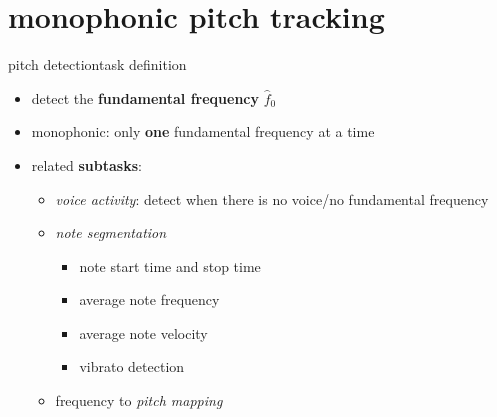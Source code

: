     \section[mono f0]{monophonic pitch tracking}
        \begin{frame}{pitch detection}{task definition}
            \begin{itemize}
                \item   detect the \textbf{fundamental frequency} $\hat{f}_0$
                \item   monophonic: only \textbf{one} fundamental frequency at a time
                \bigskip
                \item   related \textbf{subtasks}:
                    \begin{itemize}
                        \item   \textit{voice activity}: detect when there is no voice/no fundamental frequency
                        \item   \textit{note segmentation}
                            \begin{itemize}
                                \item   note start time and stop time
                                \item   average note frequency
                                \item   average note velocity
                                \item   vibrato detection
                            \end{itemize}
                        \item   frequency to \textit{pitch mapping}
                    \end{itemize}
            \end{itemize}
        \end{frame}

